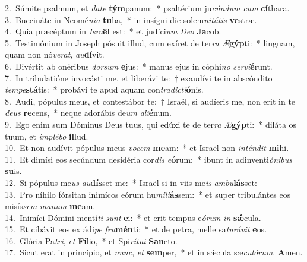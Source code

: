 {2.~}Súmite psalmum, et \textit{da}\textit{te} \textbf{tým}panum:~* psaltérium ju\textit{cún}\textit{dum} \textit{cum} \textbf{cí}thara.\\
{3.~}Buccináte in Neomé\textit{ni}\textit{a} \textbf{tu}ba,~* in insígni die solem\textit{ni}\textit{tá}\textit{tis} \textbf{ve}stræ.\\
{4.~}Quia præcéptum in \textit{Is}\textit{ra}\textbf{ël} est:~* et judíci\textit{um} \textit{De}\textit{o} \textbf{Ja}cob.\\
{5.~}Testimónium in Joseph pósuit illud, cum exíret de ter\textit{ra} \textit{Æ}\textbf{gýp}ti:~* linguam, quam non nó\textit{ve}\textit{rat}, \textit{au}\textbf{dí}vit.\\
{6.~}Divértit ab onéribus \textit{dor}\textit{sum} \textbf{e}jus:~* manus ejus in cóphi\textit{no} \textit{ser}\textit{vi}\textbf{é}runt.\\
{7.~}In tribulatióne invocásti me, et liberávi te:~† exaudívi te in abscóndito \textit{tem}\textit{pe}\textbf{stá}tis:~* probávi te apud aquam con\textit{tra}\textit{di}\textit{cti}\textbf{ó}nis.\\
{8.~}Audi, pópulus meus, et contestábor te:~† Israël, si audíeris me, non erit in te \textit{de}\textit{us} \textbf{re}cens,~* neque adorábis de\textit{um} \textit{a}\textit{li}\textbf{é}num.\\
{9.~}Ego enim sum Dóminus Deus tuus, qui edúxi te de ter\textit{ra} \textit{Æ}\textbf{gýp}ti:~* diláta os tuum, et \textit{im}\textit{plé}\textit{bo} \textbf{il}lud.\\
{10.~}Et non audívit pópulus meus \textit{vo}\textit{cem} \textbf{me}am:~* et Israël non \textit{in}\textit{tén}\textit{dit} \textbf{mi}hi.\\
{11.~}Et dimísi eos secúndum desidéria cor\textit{dis} \textit{e}\textbf{ó}rum:~* ibunt in adinventi\textit{ó}\textit{ni}\textit{bus} \textbf{su}is.\\
{12.~}Si pópulus me\textit{us} \textit{au}\textbf{dís}set me:~* Israël si in viis me\textit{is} \textit{am}\textit{bu}\textbf{lás}set:\\
{13.~}Pro níhilo fórsitan inimícos eórum hu\textit{mi}\textit{li}\textbf{ás}sem:~* et super tribulántes eos misís\textit{sem} \textit{ma}\textit{num} \textbf{me}am.\\
{14.~}Inimíci Dómini mentí\textit{ti} \textit{sunt} \textbf{e}i:~* et erit tempus e\textit{ó}\textit{rum} \textit{in} \textbf{sǽ}cula.\\
{15.~}Et cibávit eos ex ádi\textit{pe} \textit{fru}\textbf{mén}ti:~* et de petra, melle sa\textit{tu}\textit{rá}\textit{vit} \textbf{e}os.\\
{16.~}Glória Pa\textit{tri}, \textit{et} \textbf{Fí}lio,~* et Spi\textit{rí}\textit{tu}\textit{i} \textbf{San}cto.\\
{17.~}Sicut erat in princípio, et \textit{nunc}, \textit{et} \textbf{sem}per,~* et in sǽcula sæ\textit{cu}\textit{ló}\textit{rum}. \textbf{A}men.\\
